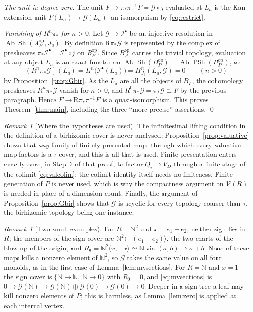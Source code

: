 \documentclass[11pt]{article}
\newcommand{\N}{\mathbb N}
\newcommand{\Sh}{\operatorname{Sh}}
\newcommand{\PSh}{\operatorname{PSh}}
\newcommand{\Ab}{\operatorname{Ab}}
\newcommand{\R}{\mathrm R}
\newcommand{\Jb}{J_{\mathrm b}}
\newcommand{\G}{\mathcal G}
\newcommand{\I}{\mathcal I}
\newcommand{\V}{\mathcal V}
\theoremstyle{definition}
\theoremstyle{remark}
\newtheorem{remark}[theorem]{Remark}
\begin{document}
\emph{The unit in degree zero.}  The unit \(F\to\pi_*\pi^{-1}F=\G\circ j\)
evaluated at \(L_a\) is the Kan extension unit \(F(L_a)\to\G(L_a)\), an
isomorphism by \eqref{eq:restrict}.

\emph{Vanishing of \(R^n\pi_*\) for \(n>0\).}  Let \(\G\to\I^\bullet\) be an
injective resolution in \(\Ab\Sh(A_P^{\mathrm{op}},\Jb)\).  By definition
\(\R\pi_*\G\) is represented by the complex of presheaves
\(\pi_*\I^\bullet=\I^\bullet\circ j\) on \(B_P^{\mathrm{op}}\).  Since
\(B_P^{\mathrm{op}}\) carries the trivial topology, evaluation at any object
\(L_a\) is an exact functor on \(\Ab\Sh(B_P^{\mathrm{op}})=\Ab\PSh(B_P^{\mathrm{op}})\),
so
\[
             (R^n\pi_*\G)(L_a)=H^n\bigl(\I^\bullet(L_a)\bigr)
             =H^n_{\Jb}(L_a,\G)=0
                                      \qquad(n>0)
\]
by Proposition~\ref{prop:Gbir}.  As the \(L_a\) are all the objects of
\(B_P\), the cohomology presheaves \(R^n\pi_*\G\) vanish for \(n>0\), and
\(R^0\pi_*\G=\pi_*\G\cong F\) by the previous paragraph.  Hence
\(F\to\R\pi_*\pi^{-1}F\) is a quasi-isomorphism.  This proves
Theorem~\ref{thm:main}, including the three ``more precise'' assertions.
\qed

\begin{remark}[Where the hypotheses are used]\label{rem:infinitesimal}
The infinitesimal lifting condition in the definition of a birhizomic cover
is never analysed: Proposition~\ref{prop:valuative} shows that \emph{any}
family of finitely presented maps through which every valuative map
factors is a \(\tau\)-cover, and this is all that is used.  Finite
presentation enters exactly once, in Step~3 of that proof, to factor
\(Q_i\to V_D\) through a finite stage of the colimit \eqref{eq:valcolim};
the colimit identity itself needs no finiteness.  Finite generation of
\(P\) is never used, which is why the compactness argument on \(\V(R)\) is
needed in place of a dimension count.  Finally, the argument of
Proposition~\ref{prop:Gbir} shows that \(\G\) is acyclic for every topology
coarser than \(\tau\), the birhizomic topology being one instance.
\end{remark}

\begin{remark}[Two small examples]
For \(R=\N^2\) and \(x=e_1-e_2\), neither sign lies in \(R\); the members
of the sign cover are \(\N^2\langle\pm(e_1-e_2)\rangle\), the two charts of
the blow-up of the origin, and \(R_0=\N^2\langle x,-x\rangle\simeq\N\) via
\((a,b)\mapsto a+b\).  None of these maps kills a nonzero element of
\(\N^2\), so \(\G\) takes the same value on all four monoids, as in the first
case of Lemma~\ref{lem:mvsections}.  For \(R=\N\) and \(x=1\) the sign
cover is \(\{\N\to\N,\ \N\to0\}\) with \(R_0=0\), and
\eqref{eq:mvsections} is \(0\to\G(\N)\to\G(\N)\oplus\G(0)\to\G(0)\to0\).
Deeper in a sign tree a leaf may kill nonzero elements of \(P\); this is
harmless, as Lemma~\ref{lem:zero} is applied at each internal vertex.
\end{remark}
\end{document}
